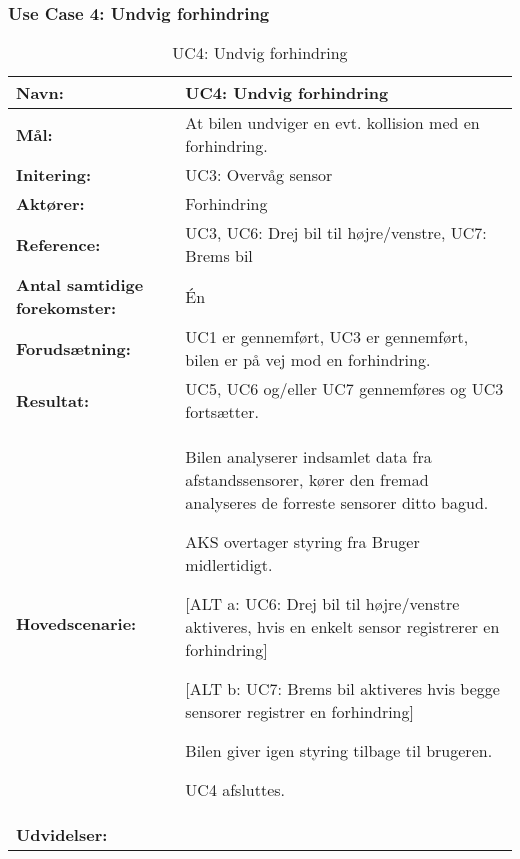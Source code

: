 \subsubsection{Use Case 4: Undvig forhindring}
\begin{table}[h]
\begin{tabularx}{\textwidth}{| L{3.3 cm} | Z |} \hline

\textbf{Navn:} 						& UC4: Undvig forhindring											\\ \hline
\textbf{Mål:}						& At bilen undviger en evt. kollision med en forhindring.	\\ \hline
\textbf{Initering:}					& UC3: Overvåg sensor 										\\ \hline
\textbf{Aktører:} 					& Forhindring 												\\ \hline
\textbf{Reference:} 				& UC3, UC6: Drej bil til højre/venstre, UC7: Brems bil 		\\ \hline
\textbf{Antal samtidige forekomster:} & Én 														\\ \hline
\textbf{Forudsætning:} 				& UC1 er gennemført, UC3 er gennemført, 
									  bilen er på vej mod en forhindring. 						\\ \hline
\textbf{Resultat:}					& UC5, UC6 og/eller UC7 gennemføres og UC3 fortsætter. 		\\ \hline
\textbf{Hovedscenarie:}				& 

\begin{packed_enum}
	\item Bilen analyserer indsamlet data fra afstandssensorer, kører den fremad analyseres de forreste sensorer ditto bagud.
	\item AKS overtager styring fra Bruger midlertidigt.
	\item 
		\begin{packed_item}\itemsep1pt \parskip0pt 
			\item {[}ALT a: UC6: Drej bil til højre/venstre aktiveres, hvis en enkelt sensor registrerer en forhindring{]}
			\item {[}ALT b: UC7: Brems bil aktiveres hvis begge sensorer registrer en forhindring{]}
		\end{packed_item}
	\item Bilen giver igen styring tilbage til brugeren.
	\item UC4 afsluttes.
\end{packed_enum} 																				\\ \hline
	\textbf{Udvidelser:}				&   													\\ \hline
\end{tabularx}
\caption{UC4: Undvig forhindring}
\label{tbl:UC4}
\end{table}